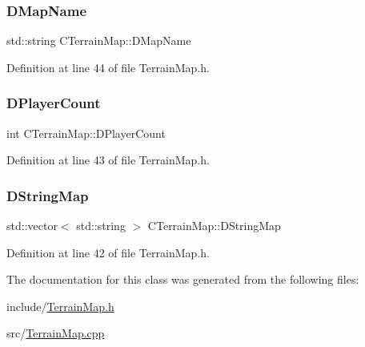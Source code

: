 \hypertarget{classCTerrainMap_a9026e4a5f073885b9e9fc3b43e93caa6}{}\label{classCTerrainMap_a9026e4a5f073885b9e9fc3b43e93caa6} 
\subsubsection{\texorpdfstring{D\+Map\+Name}{DMapName}}
{\footnotesize\ttfamily std\+::string C\+Terrain\+Map\+::\+D\+Map\+Name\hspace{0.3cm}{\ttfamily [protected]}}



Definition at line 44 of file Terrain\+Map.\+h.

\hypertarget{classCTerrainMap_a79e2cf566ac9dfbaddd2c73ea256785b}{}\label{classCTerrainMap_a79e2cf566ac9dfbaddd2c73ea256785b} 
\subsubsection{\texorpdfstring{D\+Player\+Count}{DPlayerCount}}
{\footnotesize\ttfamily int C\+Terrain\+Map\+::\+D\+Player\+Count\hspace{0.3cm}{\ttfamily [protected]}}



Definition at line 43 of file Terrain\+Map.\+h.

\hypertarget{classCTerrainMap_a76db5fd05e22e0aea413f49175f9c282}{}\label{classCTerrainMap_a76db5fd05e22e0aea413f49175f9c282} 
\subsubsection{\texorpdfstring{D\+String\+Map}{DStringMap}}
{\footnotesize\ttfamily std\+::vector$<$ std\+::string $>$ C\+Terrain\+Map\+::\+D\+String\+Map\hspace{0.3cm}{\ttfamily [protected]}}



Definition at line 42 of file Terrain\+Map.\+h.



The documentation for this class was generated from the following files\+:\begin{DoxyCompactItemize}
\item 
include/\hyperlink{TerrainMap_8h}{Terrain\+Map.\+h}\item 
src/\hyperlink{TerrainMap_8cpp}{Terrain\+Map.\+cpp}\end{DoxyCompactItemize}
